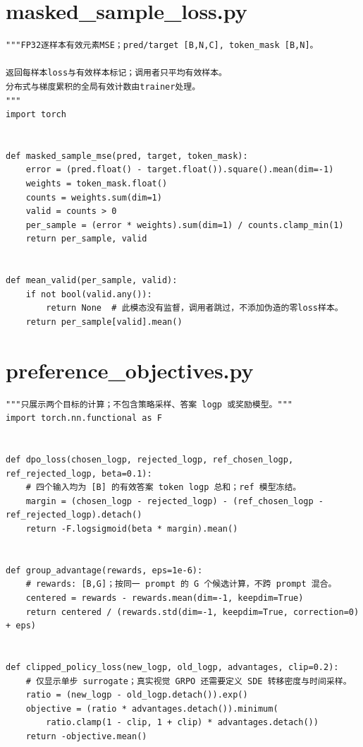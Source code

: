 \section{masked\_sample\_loss.py}
\label{code-masked-sample-loss}
\begin{verbatim}
"""FP32逐样本有效元素MSE；pred/target [B,N,C], token_mask [B,N]。

返回每样本loss与有效样本标记；调用者只平均有效样本。
分布式与梯度累积的全局有效计数由trainer处理。
"""
import torch


def masked_sample_mse(pred, target, token_mask):
    error = (pred.float() - target.float()).square().mean(dim=-1)
    weights = token_mask.float()
    counts = weights.sum(dim=1)
    valid = counts > 0
    per_sample = (error * weights).sum(dim=1) / counts.clamp_min(1)
    return per_sample, valid


def mean_valid(per_sample, valid):
    if not bool(valid.any()):
        return None  # 此模态没有监督，调用者跳过，不添加伪造的零loss样本。
    return per_sample[valid].mean()
\end{verbatim}

\section{preference\_objectives.py}
\label{code-preference-objectives}
\begin{verbatim}
"""只展示两个目标的计算；不包含策略采样、答案 logp 或奖励模型。"""
import torch.nn.functional as F


def dpo_loss(chosen_logp, rejected_logp, ref_chosen_logp, ref_rejected_logp, beta=0.1):
    # 四个输入均为 [B] 的有效答案 token logp 总和；ref 模型冻结。
    margin = (chosen_logp - rejected_logp) - (ref_chosen_logp - ref_rejected_logp).detach()
    return -F.logsigmoid(beta * margin).mean()


def group_advantage(rewards, eps=1e-6):
    # rewards: [B,G]；按同一 prompt 的 G 个候选计算，不跨 prompt 混合。
    centered = rewards - rewards.mean(dim=-1, keepdim=True)
    return centered / (rewards.std(dim=-1, keepdim=True, correction=0) + eps)


def clipped_policy_loss(new_logp, old_logp, advantages, clip=0.2):
    # 仅显示单步 surrogate；真实视觉 GRPO 还需要定义 SDE 转移密度与时间采样。
    ratio = (new_logp - old_logp.detach()).exp()
    objective = (ratio * advantages.detach()).minimum(
        ratio.clamp(1 - clip, 1 + clip) * advantages.detach())
    return -objective.mean()
\end{verbatim}

